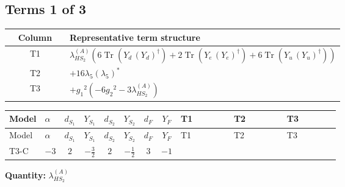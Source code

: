 \documentclass[8pt]{article}
\begin{document}
\begin{landscape}
\subsection*{Terms 1 of 3}
\begin{center}
\begin{tabular}{@{}c >{\raggedright\arraybackslash}p{0.82\linewidth}@{}}
\toprule
Column & Representative term structure \\
\midrule
T1 & \(\displaystyle {\lambda_{HS_2}^{(A)}} (6 \operatorname{Tr}\!\left({Y_d}\,\left({Y_d}\right)^{\dagger}\right)+2 \operatorname{Tr}\!\left({Y_e}\,\left({Y_e}\right)^{\dagger}\right)+6 \operatorname{Tr}\!\left({Y_u}\,\left({Y_u}\right)^{\dagger}\right))\) \\
\midrule
T2 & \(\displaystyle +16 {\lambda_5} \left({\lambda_5}\right)^{*}\) \\
\midrule
T3 & \(\displaystyle +{g_1}^2 \left(-6 {g_2}^2-3 {\lambda_{HS_2}^{(A)}}\right)\) \\
\midrule
\bottomrule
\end{tabular}
\end{center}
\smallskip
\tiny
\begin{longtable}{@{}llcccccc >{\raggedright\arraybackslash}p{0.21\linewidth} >{\raggedright\arraybackslash}p{0.21\linewidth} >{\raggedright\arraybackslash}p{0.21\linewidth}@{}}
\toprule
Model & $\alpha$ & $d_{S_1}$ & $Y_{S_1}$ & $d_{S_2}$ & $Y_{S_2}$ & $d_F$ & $Y_F$ & T1 & T2 & T3 \\
\midrule
\endfirsthead
\toprule
Model & $\alpha$ & $d_{S_1}$ & $Y_{S_1}$ & $d_{S_2}$ & $Y_{S_2}$ & $d_F$ & $Y_F$ & T1 & T2 & T3 \\
\midrule
\endhead
T3-C & $-3$ & $2$ & $-\frac{3}{2}$ & $2$ & $-\frac{1}{2}$ & $3$ & $-1$ & \scriptsize\adjustbox{max width=\linewidth}{$\begin{gathered} {\lambda_{HS_2}^{(A)}} (6 \operatorname{Tr}\!\left({Y_d}\,\left({Y_d}\right)^{\dagger}\right)+2 \operatorname{Tr}\!\left({Y_e}\,\left({Y_e}\right)^{\dagger}\right)+6 \operatorname{Tr}\!\left({Y_u}\,\left({Y_u}\right)^{\dagger}\right))\end{gathered}$} & \scriptsize\adjustbox{max width=\linewidth}{$\begin{gathered} +16 {\lambda_5} \left({\lambda_5}\right)^{*}\end{gathered}$} & \scriptsize\adjustbox{max width=\linewidth}{$\begin{gathered} +{g_1}^2 \left(-6 {g_2}^2-3 {\lambda_{HS_2}^{(A)}}\right)\end{gathered}$} \\
\midrule
\bottomrule
\end{longtable}
\clearpage
\noindent\textbf{Quantity: }$\lambda_{HS_2}^{(A)}$\par\smallskip

\end{landscape}
\end{document}
